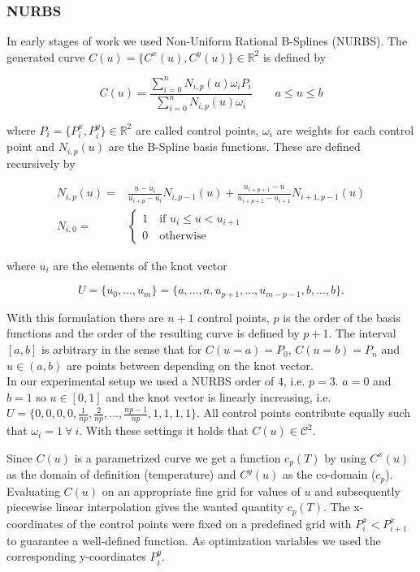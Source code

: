 \documentclass{scrartcl}[12pt, halfparskip]
\begin{document}
\subsubsection{NURBS}
In early stages of work we used Non-Uniform Rational B-Splines (NURBS). The generated curve $C(u) = \{C^x(u), C^y(u) \} \in \mathbb{R}^2$ is defined by

\begin{equation}
	C(u) = \frac{\sum_{i=0}^{n} N_{i,p}(u) \omega_i P_i }{\sum_{i=0}^{n} N_{i,p}(u) \omega_i} \qquad a \le u \le b
\end{equation}

where $P_i = \{ P_i^x, P_i^y \} \in \mathbb{R}^2$ are called control points, $\omega_i$ are weights for each control point and $N_{i,p}(u)$ are the B-Spline basis functions. These are defined recursively by

\begin{align}
	N_{i,p}(u) = & \frac{u - u_i}{u_{i+p} - u_i} N_{i,p-1}(u) + \frac{u_{i+p+1} - u}{u_{i+p+1} - u_{i+1}} N_{i+1,p-1}(u) \label{eq:NURBS_basis_polynomial} \\[1ex]
	N_{i,0} = &
	\begin{cases}
		1 \quad \text{if } u_i \le u < u_{i+1} \\
		0 \quad \text{otherwise}
	\end{cases} \nonumber
\end{align}

where $u_i$ are the elements of the knot vector

\begin{equation}
	U = \{u_0,...,u_m\}=\{a,...,a,u_{p+1},...,u_{m-p-1},b,...,b\}.
\end{equation}

With this formulation there are $n+1$ control points, $p$ is the order of the basis functions and the order of the resulting curve is defined by $p+1$. The interval $[a,b]$ is arbitrary in the sense that for $C(u=a)=P_0$,  $C(u=b)=P_n$ and $u \in (a,b)$ are points between depending on the knot vector.\\

In our experimental setup we used a NURBS order of $4$, i.e. $p=3$. $a=0$ and $b=1$ so $u \in [0,1]$ and the knot vector is linearly increasing, i.e. $U = \{ 0,0,0,0,\frac{1}{n p},\frac{2}{n p},...,\frac{n p - 1}{n p},1,1,1,1 \}$. All control points contribute equally such that $\omega_i=1 \ \forall \ i$. With these settings it holds that $C(u) \in \mathcal{C}^2$.

Since $C(u)$ is a parametrized curve we get a function $c_p(T)$ by using $C^x(u)$ as the domain of definition (temperature) and $C^y(u)$ as the co-domain ($c_p$). Evaluating $C(u)$ on an appropriate fine grid for values of $u$ and subsequently piecewise linear interpolation gives the wanted quantity $c_p(T)$.
The x-coordinates of the control points were fixed on a predefined grid with $P_i^x < P_{i+1}^x$ to guarantee a well-defined function.
As optimization variables we used the corresponding y-coordinates $P_i^y$.
\end{document}
